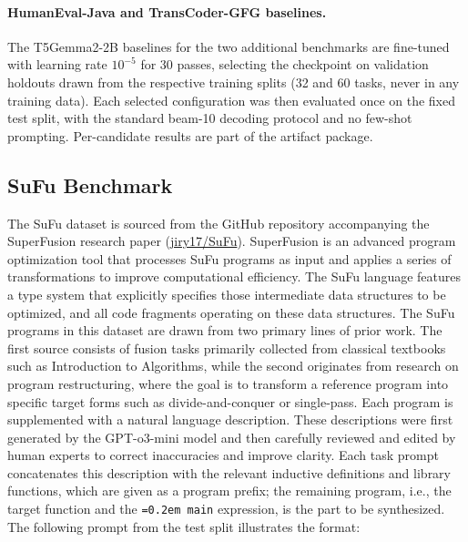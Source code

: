 \documentclass[manuscript,screen]{acmart}
\newcommand{\tcode}[1]{{\small \texttt{\spaceskip=0.2em #1}}}
\begin{document}
\paragraph{{\color{revblue}HumanEval-Java and TransCoder-GFG baselines.}}
{\color{revblue}The T5Gemma2-2B baselines for the two additional benchmarks are fine-tuned with learning rate $10^{-5}$ for 30 passes, selecting the checkpoint on validation holdouts drawn from the respective training splits (32 and 60 tasks, never in any training data). Each selected configuration was then evaluated once on the fixed test split, with the standard beam-10 decoding protocol and no few-shot prompting. Per-candidate results are part of the artifact package.
}



 \subsection{SuFu Benchmark}

The SuFu dataset is sourced from the GitHub repository accompanying the SuperFusion research paper (\href{https://github.com/jiry17/SuFu}{jiry17/SuFu}). SuperFusion is an advanced program optimization tool that processes SuFu programs as input and applies a series of transformations to improve computational efficiency. 
The SuFu language features a type system that explicitly specifies those intermediate data structures to be optimized, and all code fragments operating on these data structures.
The SuFu programs in this dataset are drawn from two primary lines of prior work. The first source consists of fusion tasks primarily collected from classical textbooks such as Introduction to Algorithms, while the second originates from research on program restructuring, where the goal is to transform a reference program into specific target forms such as divide-and-conquer or single-pass. 
Each program is supplemented with a natural language description. These descriptions were first generated by the GPT-o3-mini model and then carefully reviewed and edited by human experts to correct inaccuracies and improve clarity.
 {\color{revblue}Each task prompt concatenates this description with the relevant inductive definitions and library functions, which are given as a program prefix; the remaining program, i.e., the target function and the }\tcode{main} {\color{revblue}expression, is the part to be synthesized. The following prompt from the test split illustrates the format:
} 
\end{document}
